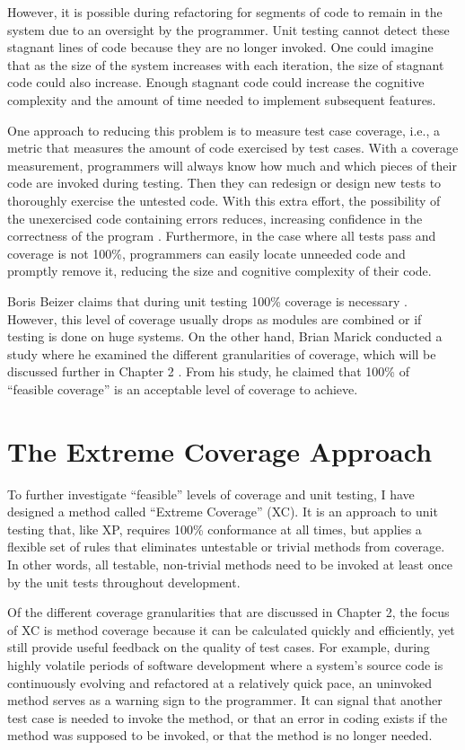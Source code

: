 However, it is possible during refactoring for segments of code to remain
in the system due to an oversight by the programmer.  Unit testing cannot
detect these stagnant lines of code because they are no longer invoked.
One could imagine that as the size of the system increases with each
iteration, the size of stagnant code could also increase.  Enough stagnant
code could increase the cognitive complexity and the amount of time needed
to implement subsequent features.

One approach to reducing this problem is to measure test case coverage,
i.e., a metric that measures the amount of code exercised by test cases.
With a coverage measurement, programmers will always know how much and
which pieces of their code are invoked during testing.  Then they can
redesign or design new tests to thoroughly exercise the untested code.
With this extra effort, the possibility of the unexercised code containing
errors reduces, increasing confidence in the correctness of the program
\cite{Dalal:1993}.  Furthermore, in the case where all tests pass and
coverage is not 100\%, programmers can easily locate unneeded code and
promptly remove it, reducing the size and cognitive complexity of their
code.

Boris Beizer claims that during unit testing 100\% coverage is necessary
\cite{Beizer:1990}.  However, this level of coverage usually drops as
modules are combined or if testing is done on huge systems.  On the other
hand, Brian Marick conducted a study where he examined the different
granularities of coverage, which will be discussed further in Chapter 2
\cite{Marick:1991}. From his study, he claimed that 100\% of ``feasible
coverage'' is an acceptable level of coverage to achieve.

\section{The Extreme Coverage Approach}
To further investigate ``feasible'' levels of coverage and unit testing, I
have designed a method called ``Extreme Coverage'' (XC).  It is an approach
to unit testing that, like XP, requires 100\% conformance at all times, but
applies a flexible set of rules that eliminates untestable or trivial
methods from coverage.  In other words, all testable, non-trivial methods
need to be invoked at least once by the unit tests throughout development.

Of the different coverage granularities that are discussed in Chapter 2,
the focus of XC is method coverage because it can be calculated quickly and
efficiently, yet still provide useful feedback on the quality of test
cases.  For example, during highly volatile periods of software development
where a system's source code is continuously evolving and refactored at a
relatively quick pace, an uninvoked method serves as a warning sign to the
programmer.  It can signal that another test case is needed to invoke the
method, or that an error in coding exists if the method was supposed to be
invoked, or that the method is no longer needed.


